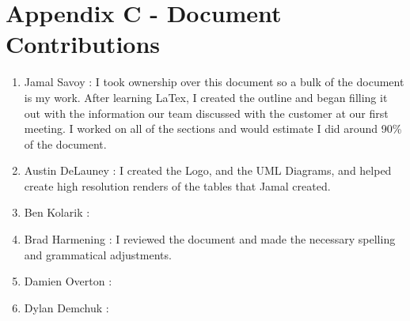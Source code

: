 \documentclass{article}
\begin{document}
\section{Appendix C - Document Contributions}\label{sec:appendixC}

\vspace{2.5mm}

\begin{addmargin}[2em]{0em}

\begin{enumerate}

\item Jamal Savoy : I took ownership over this document so a bulk of the document is my work. After learning LaTex, I created the outline and began filling it out with the information our team discussed with the customer at our first meeting. I worked on all of the sections and would estimate I did around 90\% of the document.

\item Austin DeLauney : I created the Logo, and the UML Diagrams, and helped create high resolution renders of the tables that Jamal created.

\item Ben Kolarik : 

\item Brad Harmening : I reviewed the document and made the necessary spelling and grammatical adjustments.

\item Damien Overton : 

\item Dylan Demchuk : 

\end{enumerate}
\end{addmargin}
\end{document}

